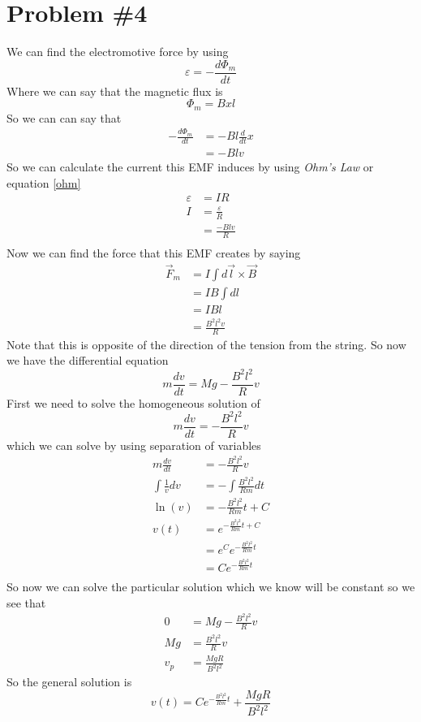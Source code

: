 \documentclass[11pt]{article}
\numberwithin{equation}{section}
\begin{document}
\section{Problem \#4}
We can find the electromotive force by using
$$\varepsilon = -\frac{d\Phi_m}{dt}$$
Where we can say that the magnetic flux is 
$$\Phi_m = Bxl$$
So we can can say that
\begin{align*}
-\frac{d\Phi_m}{dt} &= -Bl\frac{d}{dt}x\\
&= -Blv
\end{align*}
So we can calculate the current this EMF induces by using \emph{Ohm's Law} or equation \ref{ohm}
\begin{align*}
\varepsilon &= IR\\
I &= \frac{\varepsilon}{R}\\
&= \frac{-Blv}{R}\\
\end{align*}
Now we can find the force that this EMF creates by saying 
\begin{align*}
\vec{F}_m &= I\int d\vec{l}\times\vec{B}\\
&= IB\int dl\\
&= IBl\\
&= \frac{B^2l^2v}{R}
\end{align*}
Note that this is opposite of the direction of the tension from the string. So now we have the differential equation 
$$m\frac{dv}{dt} = Mg - \frac{B^2l^2}{R}v$$
First we need to solve the homogeneous solution of
$$m\frac{dv}{dt} = -\frac{B^2l^2}{R}v$$
which we can solve by using separation of variables 
\begin{align*}
m\frac{dv}{dt} &= -\frac{B^2l^2}{R}v\\
\int\frac{1}{v}dv &= -\int\frac{B^2l^2}{Rm}dt\\
\ln(v) &= -\frac{B^2l^2}{Rm}t + C\\
v(t) &= e^{-\frac{B^2l^2}{Rm}t + C}\\
&= e^{C}e^{-\frac{B^2l^2}{Rm}t}\\
&= Ce^{-\frac{B^2l^2}{Rm}t}\\
\end{align*}
So now we can solve the particular solution which we know will be constant so we see that
\begin{align*}
0 &= Mg - \frac{B^2l^2}{R}v\\
Mg &= \frac{B^2l^2}{R}v\\
v_p &= \frac{MgR}{B^2l^2}
\end{align*}
So the general solution is 
$$v(t) = Ce^{-\frac{B^2l^2}{Rm}t} + \frac{MgR}{B^2l^2}$$
\end{document}
